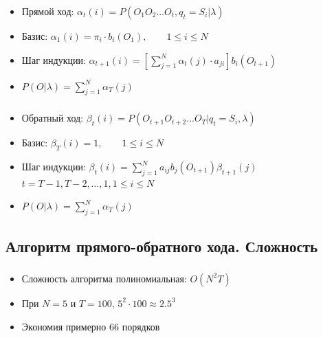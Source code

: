 \documentclass{beamer}
\begin{document}
\begin{frame}
  \frametitle{\insertsection}
  \framesubtitle{\insertsubsection}
  \begin{itemize}
  \item Прямой ход: $ \alpha_t(i) = P(O_1 O_2 \ldots O_t, q_t = S_i | \lambda)$
    \pause
  \item Базис: $ \alpha_1(i) = \pi_i \cdot b_i(O_1), \qquad 1 \le i \le N$
  \item Шаг индукции: $\displaystyle \alpha_{t + 1}(i) = \left [ \sum_{j = 1}^{N} \alpha_t(j) \cdot a_{ji} \right ] b_i(O_{t + 1})$
    \pause
  \item $\displaystyle P(O|\lambda) = \sum_{j = 1}^{N} \alpha_T(j)$
  \end{itemize}
\end{frame}

\begin{frame}
  \frametitle{\insertsection}
  \framesubtitle{\insertsubsection}
  \begin{itemize}
  \item Обратный ход: $ \beta_t(i) = P(O_{t + 1} O_{t + 2} \ldots O_T | q_t = S_i , \lambda)$
    \pause
  \item Базис: $ \beta_T(i) = 1, \qquad 1 \le i \le N$
  \item Шаг индукции: $\displaystyle \beta_{t}(i) = \sum_{j = 1}^{N} a_{ij} b_{j}(O_{t + 1})\beta_{t + 1}(j)$ \\
    $t = T - 1, T - 2, \ldots, 1, 1 \le i \le N$
    \pause
  \item $\displaystyle P(O|\lambda) = \sum_{j = 1}^{N} \alpha_T(j)$
  \end{itemize}
\end{frame}

\subsection{Алгоритм прямого-обратного хода. Сложность}

\begin{frame}
  \frametitle{\insertsection}
  \framesubtitle{\insertsubsection}
  \begin{itemize}
  \item Сложность алгоритма полиномиальная: $O(N^2T)$
    \pause
  \item При $N = 5$ и  $T = 100$, $5^2 \cdot 100 \approx 2.5^3$ \pause
    \item Экономия примерно $66$ порядков
  \end{itemize}
\end{frame}
\end{document}
